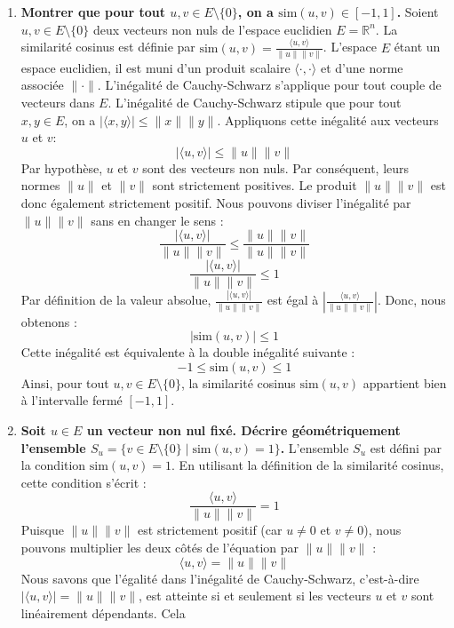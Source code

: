 \documentclass[11pt,a4paper]{report}
\begin{document}
\begin{enumerate}
\def\labelenumi{\arabic{enumi}.}
\item
  \textbf{Montrer que pour tout \(u, v \in E \setminus \{0\}\), on a
  \(\text{sim}(u, v) \in [-1, 1]\).} Soient
  \(u, v \in E \setminus \{0\}\) deux vecteurs non nuls de l'espace
  euclidien \(E = \mathbb{R}^n\). La similarité cosinus est définie par
  \(\text{sim}(u, v) = \frac{\langle u, v \rangle}{\|u\| \|v\|}\).
  L'espace \(E\) étant un espace euclidien, il est muni d'un produit
  scalaire \(\langle \cdot, \cdot \rangle\) et d'une norme associée
  \(\| \cdot \|\). L'inégalité de Cauchy-Schwarz s'applique pour tout
  couple de vecteurs dans \(E\). L'inégalité de Cauchy-Schwarz stipule
  que pour tout \(x, y \in E\), on a
  \(|\langle x, y \rangle| \le \|x\| \|y\|\). Appliquons cette inégalité
  aux vecteurs \(u\) et \(v\):
  \[|\langle u, v \rangle| \le \|u\| \|v\|\] Par hypothèse, \(u\) et
  \(v\) sont des vecteurs non nuls. Par conséquent, leurs normes
  \(\|u\|\) et \(\|v\|\) sont strictement positives. Le produit
  \(\|u\| \|v\|\) est donc également strictement positif. Nous pouvons
  diviser l'inégalité par \(\|u\| \|v\|\) sans en changer le sens :
  \[\frac{|\langle u, v \rangle|}{\|u\| \|v\|} \le \frac{\|u\| \|v\|}{\|u\| \|v\|}\]
  \[\frac{|\langle u, v \rangle|}{\|u\| \|v\|} \le 1\] Par définition de
  la valeur absolue, \(\frac{|\langle u, v \rangle|}{\|u\| \|v\|}\) est
  égal à \(\left| \frac{\langle u, v \rangle}{\|u\| \|v\|} \right|\).
  Donc, nous obtenons : \[\left| \text{sim}(u, v) \right| \le 1\] Cette
  inégalité est équivalente à la double inégalité suivante :
  \[-1 \le \text{sim}(u, v) \le 1\] Ainsi, pour tout
  \(u, v \in E \setminus \{0\}\), la similarité cosinus
  \(\text{sim}(u, v)\) appartient bien à l'intervalle fermé \([-1, 1]\).
\item
  \textbf{Soit \(u \in E\) un vecteur non nul fixé. Décrire
  géométriquement l'ensemble
  \(S_u = \{v \in E \setminus \{0\} \mid \text{sim}(u, v) = 1\}\).}
  L'ensemble \(S_u\) est défini par la condition
  \(\text{sim}(u, v) = 1\). En utilisant la définition de la similarité
  cosinus, cette condition s'écrit :
  \[\frac{\langle u, v \rangle}{\|u\| \|v\|} = 1\] Puisque
  \(\|u\| \|v\|\) est strictement positif (car \(u \ne 0\) et
  \(v \ne 0\)), nous pouvons multiplier les deux côtés de l'équation par
  \(\|u\| \|v\|\) : \[\langle u, v \rangle = \|u\| \|v\|\] Nous savons
  que l'égalité dans l'inégalité de Cauchy-Schwarz, c'est-à-dire
  \(|\langle u, v \rangle| = \|u\| \|v\|\), est atteinte si et seulement
  si les vecteurs \(u\) et \(v\) sont linéairement dépendants. Cela

\end{enumerate}
\end{document}
